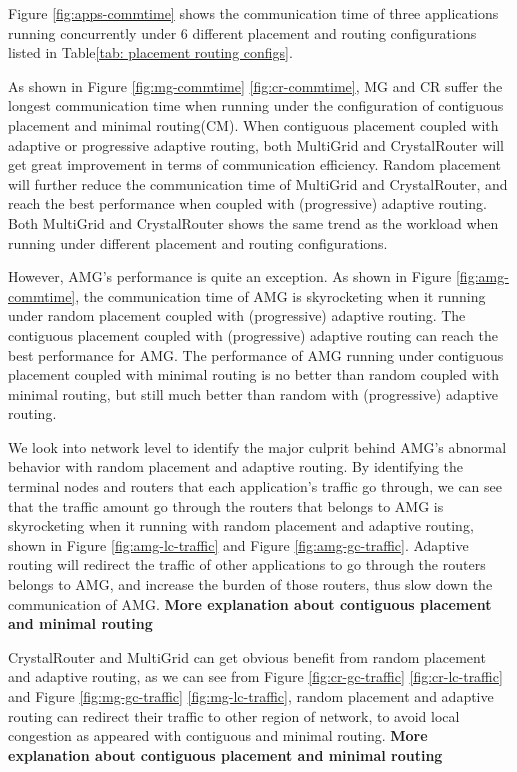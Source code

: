 \documentclass[conference,compsoc]{IEEEtran}
\begin{document}
Figure \ref{fig:apps-commtime} shows the communication time of three applications running concurrently under 6 different placement and routing configurations listed in Table\ref{tab: placement routing configs}.

As shown in Figure \ref{fig:mg-commtime} \ref{fig:cr-commtime}, MG and CR suffer the longest communication time when running under the configuration of contiguous placement and minimal routing(CM). When contiguous placement coupled with adaptive or progressive adaptive routing, both MultiGrid and CrystalRouter will get great improvement in terms of communication efficiency. Random placement will further reduce the communication time of MultiGrid and CrystalRouter, and reach the best performance when coupled with (progressive) adaptive routing. Both MultiGrid and CrystalRouter shows the same trend as the workload when running under different placement and routing configurations. 

However, AMG's performance is quite an exception. As shown in Figure \ref{fig:amg-commtime}, the communication time of AMG is skyrocketing when it running under random placement coupled with (progressive) adaptive routing. The contiguous placement coupled with (progressive) adaptive routing can reach the best performance for AMG. The performance of AMG running under contiguous placement coupled with minimal routing is no better than random coupled with minimal routing, but still much better than random with (progressive) adaptive routing. 

We look into network level to identify the major culprit behind AMG's abnormal behavior with random placement and adaptive routing. By identifying the terminal nodes and routers that each application's traffic go through, we can see that the traffic amount go through the routers that belongs to AMG is skyrocketing when it running with random placement and adaptive routing, shown in Figure \ref{fig:amg-lc-traffic} and Figure \ref{fig:amg-gc-traffic}. Adaptive routing will redirect the traffic of other applications to go through the routers belongs to AMG, and increase the burden of those routers, thus slow down the communication of AMG. \textbf{More explanation about contiguous placement and minimal routing}

CrystalRouter and MultiGrid can get obvious benefit from random placement and adaptive routing, as we can see from Figure \ref{fig:cr-gc-traffic} \ref{fig:cr-lc-traffic} and Figure \ref{fig:mg-gc-traffic} \ref{fig:mg-lc-traffic}, random placement and adaptive routing can redirect their traffic to other region of network, to avoid local congestion as appeared with contiguous and minimal routing. \textbf{More explanation about contiguous placement and minimal routing}
\end{document}
